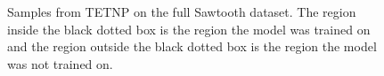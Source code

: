 \documentclass[../../main.tex]{subfiles}
\begin{document}

\begin{figure}[H]
    \centering
    \\
    \\
    \caption{Samples from TETNP on the full Sawtooth dataset. The region inside the black dotted box is the region the model was trained on and the region outside the black dotted box is the region the model was not trained on.}
    \label{fig:full-saw-preds}
\end{figure}


\end{document}
